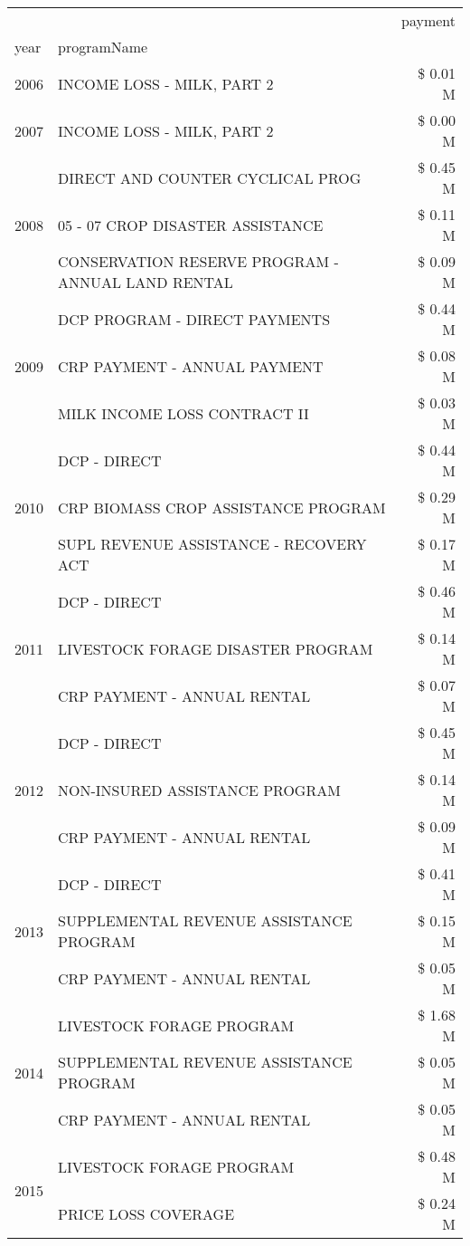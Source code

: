 \begin{tabular}{llr}
\toprule
 &  & payment \\
year & programName &  \\
\midrule
2006 & INCOME LOSS - MILK, PART 2 & \$ 0.01 M \\
\cline{1-3}
2007 & INCOME LOSS - MILK, PART 2 & \$ 0.00 M \\
\cline{1-3}
\multirow[t]{3}{*}{2008} & DIRECT AND COUNTER CYCLICAL PROG & \$ 0.45 M \\
 & 05 - 07 CROP DISASTER ASSISTANCE & \$ 0.11 M \\
 & CONSERVATION RESERVE PROGRAM - ANNUAL LAND RENTAL & \$ 0.09 M \\
\cline{1-3}
\multirow[t]{3}{*}{2009} & DCP PROGRAM - DIRECT PAYMENTS & \$ 0.44 M \\
 & CRP PAYMENT - ANNUAL PAYMENT & \$ 0.08 M \\
 & MILK INCOME LOSS CONTRACT II & \$ 0.03 M \\
\cline{1-3}
\multirow[t]{3}{*}{2010} & DCP - DIRECT & \$ 0.44 M \\
 & CRP BIOMASS CROP ASSISTANCE PROGRAM & \$ 0.29 M \\
 & SUPL REVENUE ASSISTANCE - RECOVERY ACT & \$ 0.17 M \\
\cline{1-3}
\multirow[t]{3}{*}{2011} & DCP - DIRECT & \$ 0.46 M \\
 & LIVESTOCK FORAGE DISASTER PROGRAM & \$ 0.14 M \\
 & CRP PAYMENT - ANNUAL RENTAL & \$ 0.07 M \\
\cline{1-3}
\multirow[t]{3}{*}{2012} & DCP - DIRECT & \$ 0.45 M \\
 & NON-INSURED ASSISTANCE PROGRAM & \$ 0.14 M \\
 & CRP PAYMENT - ANNUAL RENTAL & \$ 0.09 M \\
\cline{1-3}
\multirow[t]{3}{*}{2013} & DCP - DIRECT & \$ 0.41 M \\
 & SUPPLEMENTAL REVENUE ASSISTANCE PROGRAM & \$ 0.15 M \\
 & CRP PAYMENT - ANNUAL RENTAL & \$ 0.05 M \\
\cline{1-3}
\multirow[t]{3}{*}{2014} & LIVESTOCK FORAGE PROGRAM & \$ 1.68 M \\
 & SUPPLEMENTAL REVENUE ASSISTANCE PROGRAM & \$ 0.05 M \\
 & CRP PAYMENT - ANNUAL RENTAL & \$ 0.05 M \\
\cline{1-3}
\multirow[t]{3}{*}{2015} & LIVESTOCK FORAGE PROGRAM & \$ 0.48 M \\
 & PRICE LOSS COVERAGE & \$ 0.24 M \\

\end{tabular}

